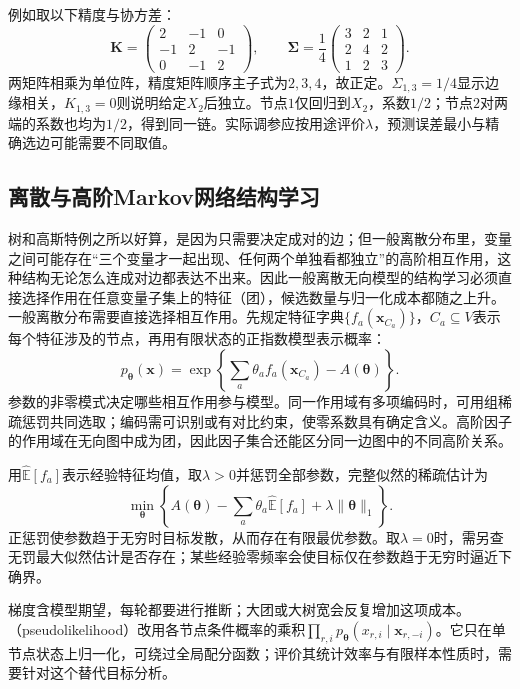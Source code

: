 例如取以下精度与协方差：
\[
  \bm{K}=
  \begin{pmatrix}
    2&-1&0\\
    -1&2&-1\\
    0&-1&2
  \end{pmatrix},
  \qquad
  \bm{\Sigma}=\frac14
  \begin{pmatrix}
    3&2&1\\
    2&4&2\\
    1&2&3
  \end{pmatrix}.
\]
两矩阵相乘为单位阵，精度矩阵顺序主子式为$2,3,4$，故正定。$\Sigma_{1,3}=1/4$显示边缘相关，$K_{1,3}=0$则说明给定$X_2$后独立。节点$1$仅回归到$X_2$，系数$1/2$；节点$2$对两端的系数也均为$1/2$，得到同一链。实际调参应按用途评价$\lambda$，预测误差最小与精确选边可能需要不同取值。

\subsection{离散与高阶Markov网络结构学习}
\label{sec:pgm-structure-learning-discrete}

树和高斯特例之所以好算，是因为只需要决定成对的边；但一般离散分布里，变量之间可能存在“三个变量才一起出现、任何两个单独看都独立”的高阶相互作用，这种结构无论怎么连成对边都表达不出来。因此一般离散无向模型的结构学习必须直接选择作用在任意变量子集上的特征（团），候选数量与归一化成本都随之上升。一般离散分布需要直接选择相互作用。先规定特征字典$\{f_a(\bm{x}_{C_a})\}$，$C_a\subseteq V$表示每个特征涉及的节点，再用有限状态的正指数模型表示概率：
\[
  p_{\bm{\theta}}(\bm{x})
  =\exp\!\left\{\sum_a\theta_a f_a(\bm{x}_{C_a})
                    -A(\bm{\theta})\right\}.
\]
参数的非零模式决定哪些相互作用参与模型。同一作用域有多项编码时，可用组稀疏惩罚共同选取；编码需可识别或有对比约束，使零系数具有确定含义。高阶因子的作用域在无向图中成为团，因此因子集合还能区分同一边图中的不同高阶关系。

用$\widehat{\mathbb{E}}[f_a]$表示经验特征均值，取$\lambda>0$并惩罚全部参数，完整似然的稀疏估计为
\[
  \min_{\bm{\theta}}\left\{
    A(\bm{\theta})-\sum_a\theta_a\widehat{\mathbb{E}}[f_a]
      +\lambda\lVert\bm{\theta}\rVert_1\right\}.
\]
正惩罚使参数趋于无穷时目标发散，从而存在有限最优参数。取$\lambda=0$时，需另查无罚最大似然估计是否存在；某些经验零频率会使目标仅在参数趋于无穷时逼近下确界。

梯度含模型期望，每轮都要进行推断；大团或大树宽会反复增加这项成本。（pseudolikelihood）改用各节点条件概率的乘积$\prod_{r,i}p_{\bm{\theta}}(x_{r,i}\mid\bm{x}_{r,-i})$。它只在单节点状态上归一化，可绕过全局配分函数；评价其统计效率与有限样本性质时，需要针对这个替代目标分析。

